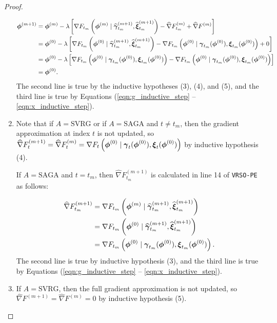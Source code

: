 \begin{proof}
\begin{enumerate}
        \begin{align*}
            \boldsymbol{\phi}^{(m+1)} &= \boldsymbol{\phi}^{(m)} - \lambda \left[\nabla F_{t_m}\left(\boldsymbol{\phi}^{(m)} \mid \widehat {\boldsymbol{\gamma}}^{(m+1)}_{t_m}, \widehat {\boldsymbol{\xi}}^{(m+1)}_{t_m}\right) - \widehat \nabla F^{(m)}_{t_m} + \widehat \nabla F^{(m)} \right] \\
            &= \boldsymbol{\phi}^{(0)} - \lambda \left[\nabla F_{t_m}\left(\boldsymbol{\phi}^{(0)} \mid \widehat {\boldsymbol{\gamma}}^{(m+1)}_{t_m}, \widehat {\boldsymbol{\xi}}^{(m+1)}_{t_m}\right) - \nabla F_{t_m}\left(\boldsymbol{\phi}^{(0)} \mid \boldsymbol{\gamma}_{t_m}(\boldsymbol{\phi}^{(0)}), \boldsymbol{\xi}_{t_m}(\boldsymbol{\phi}^{(0)})\right) + 0 \right] \\
            &= \boldsymbol{\phi}^{(0)} - \lambda \left[ \nabla F_{t_m}\left(\boldsymbol{\phi}^{(0)} \mid \boldsymbol{\gamma}_{t_m}(\boldsymbol{\phi}^{(0)}), \boldsymbol{\xi}_{t_m}(\boldsymbol{\phi}^{(0)})\right) - \nabla F_{t_m}\left(\boldsymbol{\phi}^{(0)} \mid \boldsymbol{\gamma}_{t_m}(\boldsymbol{\phi}^{(0)}), \boldsymbol{\xi}_{t_m}(\boldsymbol{\phi}^{(0)})\right) \right] \\
            &= \boldsymbol{\phi}^{(0)}.
        \end{align*}
        The second line is true by the inductive hypotheses (3), (4), and (5), and the third line is true by Equations (\ref{eqn:g_inductive_step} -- \ref{eqn:x_inductive_step}).
        \item Note that if $A = \text{SVRG}$ or if $A = \text{SAGA}$ and $t \neq t_m$, then the gradient approximation at index $t$ is not updated, so $\widehat \nabla F^{(m+1)}_t = \widehat \nabla F^{(m)}_t = \nabla F_t\left(\boldsymbol{\phi}^{(0)} \mid \boldsymbol{\gamma}_t(\boldsymbol{\phi}^{(0)}),\boldsymbol{\xi}_t(\boldsymbol{\phi}^{(0)})\right)$ by inductive hypothesis (4).
        
        If $A = \text{SAGA}$ and $t = t_m$, then $\widehat \nabla F^{(m+1)}_{t_m}$ is calculated in line 14 of \texttt{VRSO-PE} as follows:
        
        \begin{align}
            \widehat \nabla F^{(m+1)}_{t_m} &= \nabla F_{t_m}\left(\boldsymbol{\phi}^{(m)} \mid \widehat {\boldsymbol{\gamma}}^{(m+1)}_{t_m}, \widehat {\boldsymbol{\xi}}^{(m+1)}_{t_m}\right) \nonumber \\
            &= \nabla F_{t_m}\left(\boldsymbol{\phi}^{(0)} \mid \widehat {\boldsymbol{\gamma}}^{(m+1)}_{t_m}, \widehat {\boldsymbol{\xi}}^{(m+1)}_{t_m}\right) \nonumber \\
            &= \nabla F_{t_m}\left(\boldsymbol{\phi}^{(0)} \mid \boldsymbol{\gamma}_{t_m}(\boldsymbol{\phi}^{(0)}), \boldsymbol{\xi}_{t_m}(\boldsymbol{\phi}^{(0)})\right). \label{eqn:nabla_hat_inductive_step}
        \end{align}
        The second line is true by inductive hypothesis (3), and the third line is true by Equations (\ref{eqn:g_inductive_step} -- \ref{eqn:x_inductive_step}).
        \item If $A = \text{SVRG}$, then the full gradient approximation is not updated, so $\widehat \nabla F^{(m+1)} = \widehat \nabla F^{(m)} = 0$ by inductive hypothesis (5).
        

\end{enumerate}
\end{proof}
